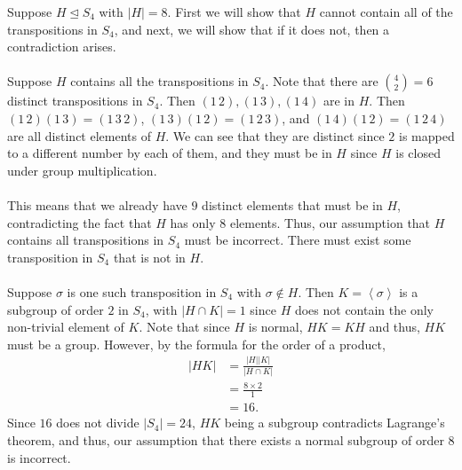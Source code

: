 \documentclass[12 pt, letterpaper]{hmcpset}
\begin{document}
\begin{solution}
	Suppose $H \trianglelefteq S_{4}$ with $\lvert H \rvert = 8$. First we will show that $H$ cannot contain all of the transpositions in $S_{4}$, and next, we will show that if it does not, then a contradiction arises. \\\\
	Suppose $H$ contains all the transpositions in $S_{4}$. Note that there are $\binom{4}{2} = 6$ distinct transpositions in $S_{4}$. Then $(1 \, 2), (1 \, 3), (1 \, 4)$ are in $H$. Then $(1 \, 2) (1 \, 3) = (1 \, 3 \, 2)$, $(1 \, 3) (1 \, 2) = (1 \, 2 \, 3)$, and $(1 \, 4) (1 \, 2) = (1 \, 2 \, 4)$ are all distinct elements of $H$. We can see that they are distinct since $2$ is mapped to a different number by each of them, and they must be in $H$ since $H$ is closed under group multiplication. \\\\
	This means that we already have $9$ distinct elements that must be in $H$, contradicting the fact that $H$ has only $8$ elements. Thus, our assumption that $H$ contains all transpositions in $S_{4}$ must be incorrect. There must exist some transposition in $S_{4}$ that is not in $H$. \\\\
	Suppose $\sigma$ is one such transposition in $S_{4}$ with $\sigma \notin H$. Then $K = \left < \sigma \right >$ is a subgroup of order $2$ in $S_{4}$, with $\lvert H \cap K \rvert = 1$ since $H$ does not contain the only non-trivial element of $K$. Note that since $H$ is normal, $HK = KH$ and thus, $HK$ must be a group. However, by the formula for the order of a product,
	\[
		\begin{split}
			\lvert HK \rvert & = \frac{\lvert H \rvert \lvert K \rvert}{\lvert H \cap K \rvert} \\
					 & = \frac{8 \times 2}{1} \\
					 & = 16.
		\end{split}
	\]
	Since $16$ does not divide $\lvert S_{4} \rvert = 24$, $HK$ being a subgroup contradicts Lagrange's theorem, and thus, our assumption that there exists a normal subgroup of order $8$ is incorrect.
\end{solution}

\pagebreak
\end{document}
